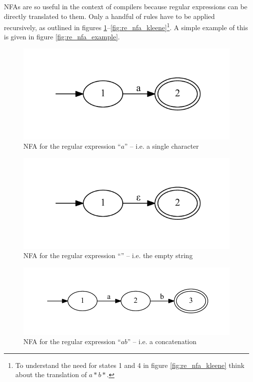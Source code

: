 			NFAs are so useful in the context of compilers because regular expressions can be directly translated to them. Only a handful of rules have to be applied recursively, as outlined in figures \ref{fig:re_nfa_char}--\ref{fig:re_nfa_kleene}\footnote{To understand the need for states 1 and 4 in figure \ref{fig:re_nfa_kleene} think about the translation of $a*b*$.}. A simple example of this is given in figure \ref{fig:re_nfa_example}.
			
			
			\begin{figure}
			\centering
			\includegraphics{figures/re_char}
			\caption{NFA for the regular expression ``$a$'' -- i.e. a single character}
			\label{fig:re_nfa_char}
			\end{figure}
			
			\begin{figure}
			\centering
			\includegraphics{figures/re_epsilon}
			\caption{NFA for the regular expression ``'' -- i.e. the empty string}
			\label{fig:re_nfa_epsilon}
			\end{figure}
			
			\begin{figure}
			\centering
			\includegraphics{figures/re_sequence}
			\caption{NFA for the regular expression ``$ab$'' -- i.e. a concatenation}
			\label{fig:re_nfa_concatenation}
			\end{figure}
			
